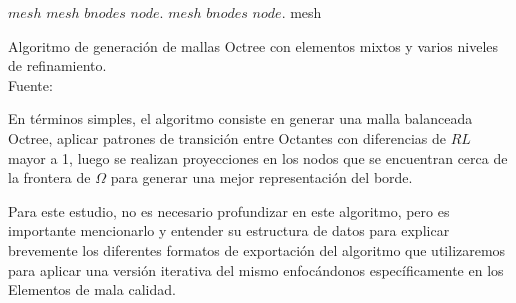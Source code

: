 \begin{algorithm}[H]
{
    $mesh$ \gets {}\;
    $mesh$ \gets {}\;
    $bnodes$ \gets {}\;
     {
         {
            $node$.\projectOnto{\Omega}\;
        }
    }
    $mesh$ \gets {}\;
    $bnodes$ \gets {}\;
     {
         {
            $node$.\projectOnto{\Omega} \;
        }
    }
    \KwRet mesh\;    
}
\caption{Algoritmo de generación de mallas Octree con elementos mixtos y varios niveles de refinamiento.\\ Fuente: \cite{daines2018repairing}}
\label{alg:propuesta_daines} 
\end{algorithm}

En términos simples,  el algoritmo consiste en generar una malla balanceada Octree, aplicar patrones de transición entre Octantes con diferencias de $RL$ mayor a 1, luego se realizan proyecciones en los nodos que se encuentran cerca de la frontera de $\Omega$ para generar una mejor representación del borde.

Para este estudio, no es necesario profundizar en este algoritmo, pero es importante mencionarlo y entender su estructura de datos para explicar brevemente los diferentes formatos de exportación del algoritmo que utilizaremos para aplicar una versión iterativa del mismo enfocándonos específicamente en los Elementos de mala calidad.



